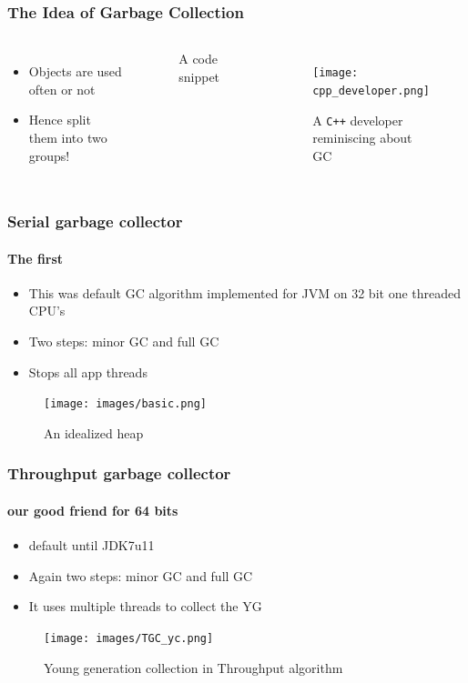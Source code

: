 \documentclass{beamer}
\begin{document}
\begin{frame}
    \frametitle{The Idea of Garbage Collection}
    \begin{columns}
        \begin{itemize}
            \item Objects are used often or not
            \item Hence split them into two groups!  
        \end{itemize}
        \begin{figure}
            \caption[bigdecimal]{A code snippet}
        \end{figure}
        \begin{figure}
            \texttt{[image: cpp\_developer.png]}
            \caption[dev]{A \texttt{C++} developer reminiscing about GC}
        \end{figure}

    \end{columns}
\end{frame}


\begin{frame}
    \frametitle{Serial garbage collector}
    \framesubtitle{The first}
    \begin{itemize}
        \item This was default GC algorithm implemented for JVM on 32 bit one threaded CPU's 
        \item Two steps: minor GC and full GC
        \item Stops all app threads 
    \end{itemize}
    \begin{figure}
        \texttt{[image: images/basic.png]}
        \caption[javaheap]{An idealized heap\cite{book} }
    \end{figure}
\end{frame}

\begin{frame}
    \frametitle{Throughput garbage collector}
    \framesubtitle{our good friend for 64 bits}
    \begin{itemize}
        \item default until JDK7u11
        \item Again two steps: minor GC and full GC 
        \item It uses multiple threads to collect the YG
    \end{itemize}
    \begin{figure}
        \texttt{[image: images/TGC\_yc.png]}
        \caption[tgc_yc]{Young generation collection in Throughput algorithm}
    \end{figure}
\end{frame}
\end{document}
